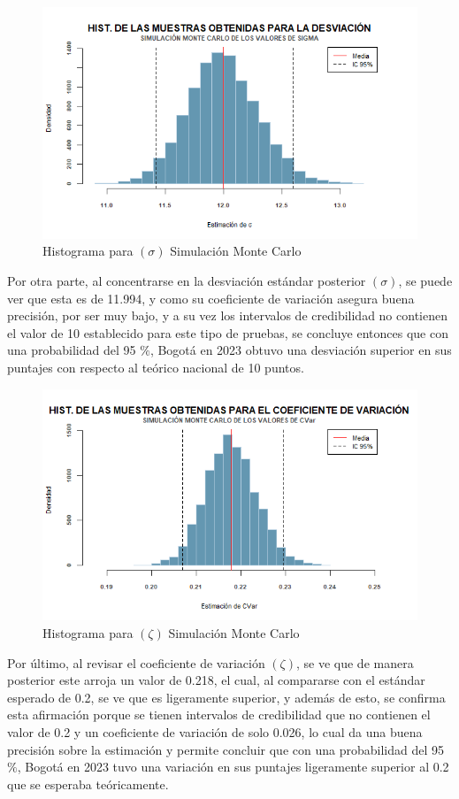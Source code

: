 \documentclass[12pt]{article}
\begin{document}
\begin{figure}[H]
    \centering
    \includegraphics[width=0.8\linewidth]{Imagenes/Histograma-2.png}
    \caption{Histograma para $(\sigma)$ Simulación Monte Carlo }
    \label{fig_enter_label}
\end{figure}

Por otra parte, al concentrarse en la desviación estándar posterior $(\sigma)$, se puede ver que esta es de 11.994, y como su coeficiente de variación asegura buena precisión, por ser muy bajo, y a su vez los intervalos de credibilidad no contienen el valor de 10 establecido para este tipo de pruebas, se concluye entonces que con una probabilidad del 95 $\%$, Bogotá en 2023 obtuvo una desviación superior en sus puntajes con respecto al teórico nacional de 10 puntos. 

\begin{figure}[H]
    \centering
    \includegraphics[width=0.8\linewidth]{Imagenes/Histograma-3.png}
    \caption{Histograma para $(\zeta)$ Simulación Monte Carlo }
    \label{fig_enter_label}
\end{figure}

Por último, al revisar el coeficiente de variación $(\zeta)$, se ve que de manera posterior este arroja un valor de 0.218, el cual, al compararse con el estándar esperado de 0.2, se ve que es ligeramente superior, y además de esto, se confirma esta afirmación porque se tienen intervalos de credibilidad que no contienen el valor de 0.2 y un coeficiente de variación de solo 0.026, lo cual da una buena precisión sobre la estimación y permite concluir que con una probabilidad del 95 $\%$, Bogotá en 2023 tuvo una variación en sus puntajes ligeramente superior al 0.2 que se esperaba teóricamente.\\
\end{document}
